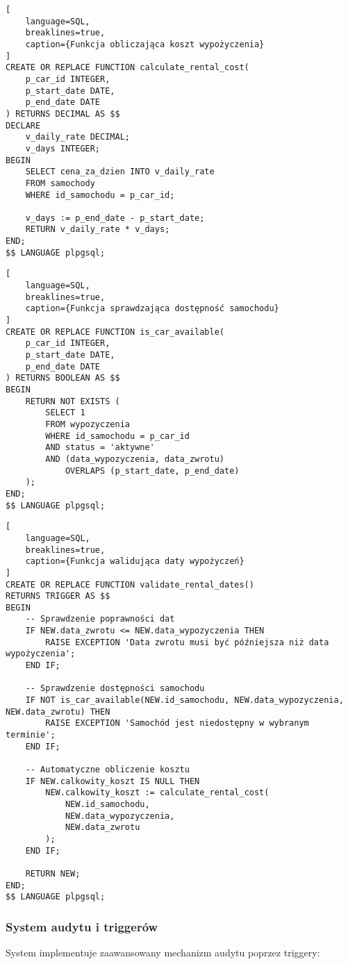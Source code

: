 \documentclass[12pt]{article}
\begin{document}
\begin{lstlisting}[
    language=SQL,
    breaklines=true,
    caption={Funkcja obliczająca koszt wypożyczenia}
]
CREATE OR REPLACE FUNCTION calculate_rental_cost(
    p_car_id INTEGER,
    p_start_date DATE,
    p_end_date DATE
) RETURNS DECIMAL AS $$
DECLARE
    v_daily_rate DECIMAL;
    v_days INTEGER;
BEGIN
    SELECT cena_za_dzien INTO v_daily_rate
    FROM samochody
    WHERE id_samochodu = p_car_id;

    v_days := p_end_date - p_start_date;
    RETURN v_daily_rate * v_days;
END;
$$ LANGUAGE plpgsql;
\end{lstlisting}
\newpage
\begin{lstlisting}[
    language=SQL,
    breaklines=true,
    caption={Funkcja sprawdzająca dostępność samochodu}
]
CREATE OR REPLACE FUNCTION is_car_available(
    p_car_id INTEGER,
    p_start_date DATE,
    p_end_date DATE
) RETURNS BOOLEAN AS $$
BEGIN
    RETURN NOT EXISTS (
        SELECT 1
        FROM wypozyczenia
        WHERE id_samochodu = p_car_id
        AND status = 'aktywne'
        AND (data_wypozyczenia, data_zwrotu) 
            OVERLAPS (p_start_date, p_end_date)
    );
END;
$$ LANGUAGE plpgsql;
\end{lstlisting}
\newpage
\begin{lstlisting}[
    language=SQL,
    breaklines=true,
    caption={Funkcja walidująca daty wypożyczeń}
]
CREATE OR REPLACE FUNCTION validate_rental_dates()
RETURNS TRIGGER AS $$
BEGIN
    -- Sprawdzenie poprawności dat
    IF NEW.data_zwrotu <= NEW.data_wypozyczenia THEN
        RAISE EXCEPTION 'Data zwrotu musi być późniejsza niż data wypożyczenia';
    END IF;

    -- Sprawdzenie dostępności samochodu
    IF NOT is_car_available(NEW.id_samochodu, NEW.data_wypozyczenia, NEW.data_zwrotu) THEN
        RAISE EXCEPTION 'Samochód jest niedostępny w wybranym terminie';
    END IF;

    -- Automatyczne obliczenie kosztu
    IF NEW.calkowity_koszt IS NULL THEN
        NEW.calkowity_koszt := calculate_rental_cost(
            NEW.id_samochodu,
            NEW.data_wypozyczenia,
            NEW.data_zwrotu
        );
    END IF;

    RETURN NEW;
END;
$$ LANGUAGE plpgsql;
\end{lstlisting}
\newpage
\subsubsection{System audytu i triggerów}
System implementuje zaawansowany mechanizm audytu poprzez triggery:
\end{document}
